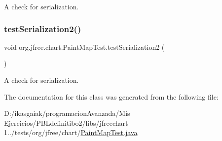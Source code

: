 A check for serialization. \mbox{\label{classorg_1_1jfree_1_1chart_1_1_paint_map_test_a9b38e247cc8116a944dc65db277eb197}} 
\subsubsection{\texorpdfstring{test\+Serialization2()}{testSerialization2()}}
{\footnotesize\ttfamily void org.\+jfree.\+chart.\+Paint\+Map\+Test.\+test\+Serialization2 (\begin{DoxyParamCaption}{ }\end{DoxyParamCaption})}

A check for serialization. 

The documentation for this class was generated from the following file\+:\begin{DoxyCompactItemize}
\item 
D\+:/ikasgaiak/programacion\+Avanzada/\+Mis Ejercicios/\+P\+B\+Ldefinitibo2/libs/jfreechart-\/1../tests/org/jfree/chart/\mbox{\hyperlink{_paint_map_test_8java}{Paint\+Map\+Test.\+java}}\end{DoxyCompactItemize}
